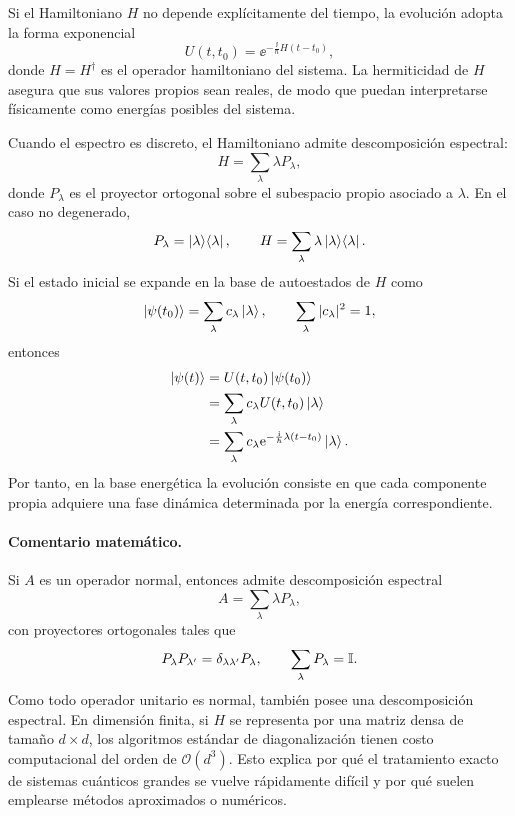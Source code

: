 \documentclass[../main.tex]{subfiles}
\begin{document}
Si el Hamiltoniano $H$ no depende explícitamente del tiempo, la evolución adopta la forma exponencial
\begin{equation*}
    U(t,t_0)=\ee^{-\frac{\ii}{\hbar}H(t-t_0)},
\end{equation*}
donde $H=H^\dagger$ es el operador hamiltoniano del sistema. La hermiticidad de $H$ asegura que sus valores propios sean reales, de modo que puedan interpretarse físicamente como energías posibles del sistema.

Cuando el espectro es discreto, el Hamiltoniano admite descomposición espectral:
\begin{equation*}
    H=\sum_{\lambda}\lambda P_\lambda,
\end{equation*}
donde $P_\lambda$ es el proyector ortogonal sobre el subespacio propio asociado a $\lambda$. En el caso no degenerado,
\begin{equation*}
    P_\lambda=\ket{\lambda}\!\bra{\lambda},
    \qquad
    H=\sum_{\lambda}\lambda\ket{\lambda}\!\bra{\lambda}.
\end{equation*}
Si el estado inicial se expande en la base de autoestados de $H$ como
\begin{equation*}
    \ket{\psi(t_0)}=\sum_{\lambda}c_\lambda\ket{\lambda},
    \qquad
    \sum_{\lambda}|c_\lambda|^2=1,
\end{equation*}
entonces
\begin{align*}
    \ket{\psi(t)}
    &=
    U(t,t_0)\ket{\psi(t_0)}\\
    &=
    \sum_{\lambda}c_\lambda U(t,t_0)\ket{\lambda}\\
    &=
    \sum_{\lambda}c_\lambda \mathrm{e}^{-\frac{\mathrm{i}}{\hbar}\lambda(t-t_0)}\ket{\lambda}.
\end{align*}
Por tanto, en la base energética la evolución consiste en que cada componente propia adquiere una fase dinámica determinada por la energía correspondiente.

\paragraph{Comentario matemático.}
Si $A$ es un operador normal, entonces admite descomposición espectral
\begin{equation*}
    A=\sum_{\lambda}\lambda P_\lambda,
\end{equation*}
con proyectores ortogonales tales que
\begin{equation*}
    P_\lambda P_{\lambda'}=\delta_{\lambda\lambda'}P_\lambda,
    \qquad
    \sum_{\lambda}P_\lambda=\mathbb{I}.
\end{equation*}
Como todo operador unitario es normal, también posee una descomposición espectral. En dimensión finita, si $H$ se representa por una matriz densa de tamaño $d\times d$, los algoritmos estándar de diagonalización tienen costo computacional del orden de $\mathcal{O}(d^3)$. Esto explica por qué el tratamiento exacto de sistemas cuánticos grandes se vuelve rápidamente difícil y por qué suelen emplearse métodos aproximados o numéricos.
\end{document}
